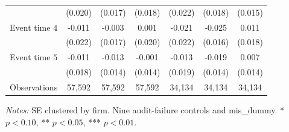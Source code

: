 \documentclass[10pt]{article}
\begin{document}
\begin{minipage}{19cm}
\begin{threeparttable}
\begin{tabular}{l c c c c c c }
 & (0.020) & (0.017) & (0.018) & (0.022) & (0.018) & (0.015) \\
Event time $4$ & -0.011 & -0.003 & 0.001 & -0.021 & -0.025 & 0.011 \\
 & (0.022) & (0.017) & (0.020) & (0.022) & (0.016) & (0.018) \\
Event time $5$ & -0.011 & -0.013 & -0.001 & -0.013 & -0.019 & 0.007 \\
 & (0.018) & (0.014) & (0.014) & (0.019) & (0.014) & (0.014) \\
\midrule
Observations & 57,592 & 57,592 & 57,592 & 34,134 & 34,134 & 34,134 \\
\bottomrule
\end{tabular}
\begin{tablenotes}\fontsize{9}{11}\selectfont
\item \raggedright \fontsize{9}{11}\selectfont \textit{Notes:} SE clustered by firm. Nine audit-failure controls and mis\_dummy. * $p<0.10$, ** $p<0.05$, *** $p<0.01$.
\end{tablenotes}
\end{threeparttable}

\end{minipage}
\end{document}
